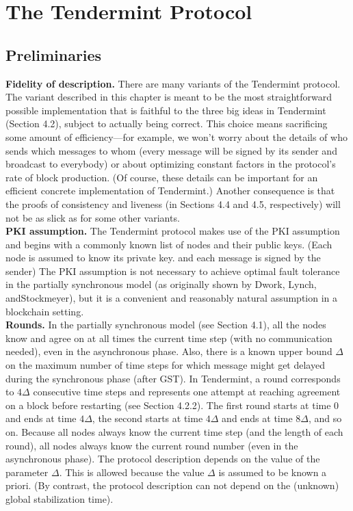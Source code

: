 \section{The Tendermint Protocol}
\subsection{Preliminaries}
\noindent
\textbf{Fidelity of description.}
There are many variants of the Tendermint protocol. The variant
described in this chapter is meant to be the most straightforward possible implementation that
is faithful to the three big ideas in Tendermint (Section 4.2), subject to actually being correct.
This choice means sacrificing some amount of efficiency—for example, we won’t worry about
the details of who sends which messages to whom (every message will be signed by its sender
and broadcast to everybody) or about optimizing constant factors in the protocol’s rate
of block production. (Of course, these details can be important for an efficient concrete
implementation of Tendermint.) Another consequence is that the proofs of consistency and
liveness (in Sections 4.4 and 4.5, respectively) will not be as slick as for some other variants.\\

\noindent
\textbf{PKI assumption.} 
The Tendermint protocol makes use of the PKI assumption and begins
with a commonly known list of nodes and their public keys. (Each node is assumed to
know its private key. and each message is signed by the sender) The PKI assumption is not necessary to achieve optimal fault tolerance in 
the partially synchronous model (as originally shown by Dwork, Lynch, andStockmeyer), but it is a convenient and reasonably natural 
assumption in a blockchain setting.\\

\noindent
\textbf{Rounds.} 
In the partially synchronous model (see Section 4.1), all the nodes know and agree on at all times the current time step (with no 
communication needed), even in the asynchronous phase. Also, there is a known upper bound $\Delta$ on the maximum number of time steps for 
which message might get delayed during the synchronous phase (after GST). In Tendermint, a round corresponds to $4\Delta$ consecutive time 
steps and represents one attempt at reaching agreement on a block before restarting (see Section 4.2.2). The first round starts at time 0 
and ends at time $4\Delta$, the second starts at time $4\Delta$ and ends at time $8\Delta$, and so on. Because all nodes always know the 
current time step (and the length of each round), all nodes always know the current round number (even in the asynchronous phase). The
protocol description depends on the value of the parameter $\Delta$. This is allowed because the value $\Delta$ is assumed to be known a 
priori. (By contrast, the protocol description can not depend on the (unknown) global stabilization time).\\

